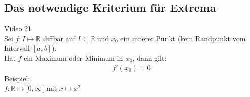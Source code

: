 \subsection{Das notwendige Kriterium für Extrema}
\href{https://youtu.be/IkfZZjapfWk}{Video 21}\\
Sei $ f: I\longmapsto \mathbb{R} $ diffbar auf $ I\subseteq \mathbb{R} $ und $ x_0 $ ein innerer Punkt (kein Randpunkt vom Intervall $ [a,b] $).\\
Hat $ f  $ ein Maximum oder Minimum in $ x_0 $, dann gilt:\\
\begin{align*}
f'(x_0)=0
\end{align*}
Beispiel:\\
\textbullet\;\; $ f:\mathbb{R}\longmapsto[0,\infty[ $ mit $ x\longmapsto x^2 $\\
